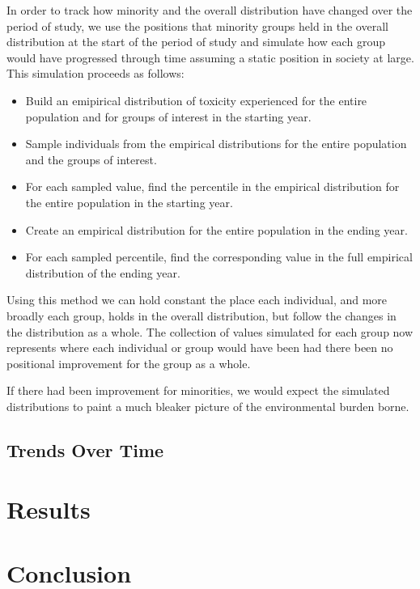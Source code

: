\documentclass[12pt,twoside]{dukestatscithesis}
\theoremstyle{definition}
\theoremstyle{definition}
\theoremstyle{definition}
\theoremstyle{remark}
\begin{document}
In order to track how minority and the overall distribution have changed
over the period of study, we use the positions that minority groups held
in the overall distribution at the start of the period of study and
simulate how each group would have progressed through time assuming a
static position in society at large. This simulation proceeds as
follows:
\begin{itemize}
\item
  Build an emipirical distribution of toxicity experienced for the
  entire population and for groups of interest in the starting year.
\item
  Sample individuals from the empirical distributions for the entire
  population and the groups of interest.
\item
  For each sampled value, find the percentile in the empirical
  distribution for the entire population in the starting year.
\item
  Create an empirical distribution for the entire population in the
  ending year.
\item
  For each sampled percentile, find the corresponding value in the full
  empirical distribution of the ending year.
\end{itemize}
Using this method we can hold constant the place each individual, and
more broadly each group, holds in the overall distribution, but follow
the changes in the distribution as a whole. The collection of values
simulated for each group now represents where each individual or group
would have been had there been no positional improvement for the group
as a whole.

If there had been improvement for minorities, we would expect the
simulated distributions to paint a much bleaker picture of the
environmental burden borne.

\section{Trends Over Time}\label{trends-over-time}

\chapter{Results}\label{organization}

\chapter*{Conclusion}\label{conclusion}
\end{document}
